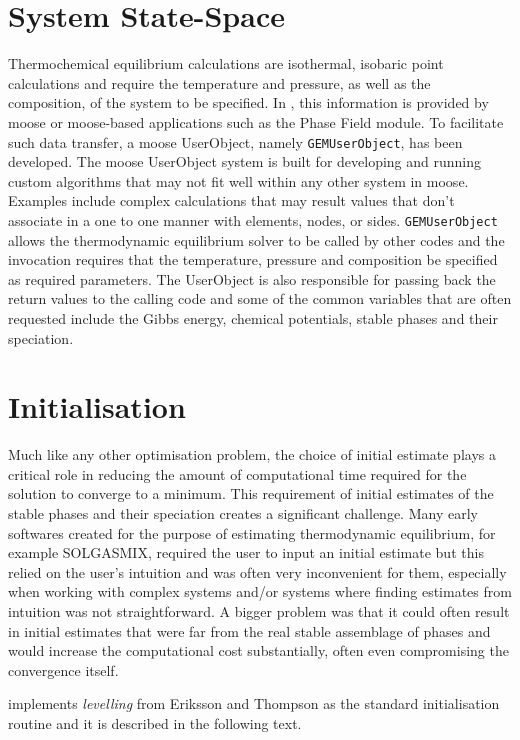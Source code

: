 \section{System State-Space}
	Thermochemical equilibrium calculations are isothermal, isobaric point calculations and require the temperature and pressure, as well as the composition, of the system to be specified. In {\GEM}, this information is provided by \gls{moose} or \gls{moose}-based applications such as the Phase Field module. To facilitate such data transfer, a \gls{moose} UserObject, namely \texttt{GEMUserObject}, has been developed. The \gls{moose} UserObject system is built for developing and running custom algorithms that may not fit well within any other system in \gls{moose}. Examples include complex calculations that may result values that don't associate in a one to one manner with elements, nodes, or sides. \texttt{GEMUserObject} allows the thermodynamic equilibrium solver to be called by other codes and the invocation requires that the temperature, pressure and composition be specified as required parameters. The UserObject is also responsible for passing back the return values to the calling code and some of the common variables that are often requested include the Gibbs energy, chemical potentials, stable phases and their speciation.

\section{Initialisation}
	Much like any other optimisation problem, the choice of initial estimate plays a critical role in reducing the amount of computational time required for the solution to converge to a minimum. This requirement of initial estimates of the stable  phases and their speciation creates a significant challenge. Many early softwares created for the purpose of estimating thermodynamic equilibrium, for example SOLGASMIX, required the user to input an initial estimate but this relied on the user's intuition and was often very inconvenient for them, especially when working with complex systems and/or systems where finding estimates from intuition was not straightforward. A bigger problem was that it could often result in initial estimates that were far from the real stable assemblage of phases and would increase the computational cost substantially, often even compromising the convergence itself. 

    {\GEM} implements \emph{levelling} from Eriksson and Thompson \cite{Eriksson89} as the standard initialisation routine and it is described in the following text.
	
